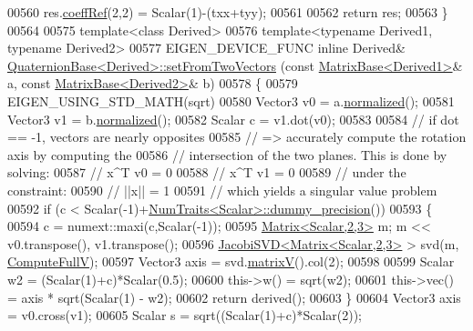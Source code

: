 \begin{DoxyCode}
{00560   res.\hyperlink{class_eigen_1_1_plain_object_base_a25626a55b26a4323565f79d1b7c48ea8}{coeffRef}(2,2) = Scalar(1)-(txx+tyy);
00561 
00562   \textcolor{keywordflow}{return} res;
00563 \}
00564 
00575 \textcolor{keyword}{template}<\textcolor{keyword}{class} Derived>
00576 \textcolor{keyword}{template}<\textcolor{keyword}{typename} Derived1, \textcolor{keyword}{typename} Derived2>
00577 EIGEN\_DEVICE\_FUNC \textcolor{keyword}{inline} Derived& \hyperlink{group___geometry___module_a61ce1b4b1faf6849c9663fd86e9b3a70}{QuaternionBase<Derived>::setFromTwoVectors}
      (\textcolor{keyword}{const} \hyperlink{group___core___module_class_eigen_1_1_matrix_base}{MatrixBase<Derived1>}& a, \textcolor{keyword}{const} \hyperlink{group___core___module_class_eigen_1_1_matrix_base}{MatrixBase<Derived2>}& b)
00578 \{
00579   EIGEN\_USING\_STD\_MATH(sqrt)
00580   Vector3 v0 = a.\hyperlink{group___core___module_a5cf2fd4c57e59604fd4116158fd34308}{normalized}();
00581   Vector3 v1 = b.\hyperlink{group___core___module_a5cf2fd4c57e59604fd4116158fd34308}{normalized}();
00582   Scalar c = v1.dot(v0);
00583 
00584   \textcolor{comment}{// if dot == -1, vectors are nearly opposites}
00585   \textcolor{comment}{// => accurately compute the rotation axis by computing the}
00586   \textcolor{comment}{//    intersection of the two planes. This is done by solving:}
00587   \textcolor{comment}{//       x^T v0 = 0}
00588   \textcolor{comment}{//       x^T v1 = 0}
00589   \textcolor{comment}{//    under the constraint:}
00590   \textcolor{comment}{//       ||x|| = 1}
00591   \textcolor{comment}{//    which yields a singular value problem}
00592   \textcolor{keywordflow}{if} (c < Scalar(-1)+\hyperlink{group___core___module_struct_eigen_1_1_num_traits}{NumTraits<Scalar>::dummy\_precision}())
00593   \{
00594     c = numext::maxi(c,Scalar(-1));
00595     \hyperlink{group___core___module_class_eigen_1_1_matrix}{Matrix<Scalar,2,3>} m; m << v0.transpose(), v1.transpose();
00596     \hyperlink{group___s_v_d___module_class_eigen_1_1_jacobi_s_v_d}{JacobiSVD<Matrix<Scalar,2,3>} > svd(m, 
      \hyperlink{group__enums_ggae3e239fb70022eb8747994cf5d68b4a9a52c6f7e80bbf9a42297c88f700245b51}{ComputeFullV});
00597     Vector3 axis = svd.\hyperlink{group___s_v_d___module_a245a453b5e7347f737295c23133238c4}{matrixV}().col(2);
00598 
00599     Scalar w2 = (Scalar(1)+c)*Scalar(0.5);
00600     this->w() = sqrt(w2);
00601     this->vec() = axis * sqrt(Scalar(1) - w2);
00602     \textcolor{keywordflow}{return} derived();
00603   \}
00604   Vector3 axis = v0.cross(v1);
00605   Scalar s = sqrt((Scalar(1)+c)*Scalar(2));
}
\end{DoxyCode}
